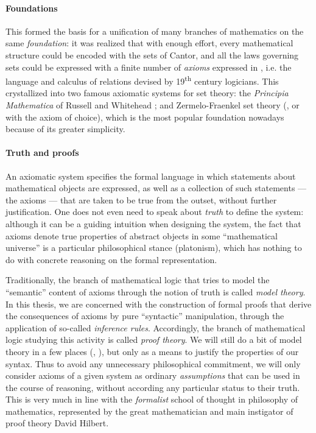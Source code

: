 \paragraph{Foundations}

This formed the basis for a unification of many branches of mathematics on the
same \emph{foundation}: it was realized that with enough effort, every
mathematical structure could be encoded with the sets of Cantor, and all the
laws governing sets could be expressed with a finite number of \emph{axioms}
expressed in , i.e. the language and calculus of relations
devised by 19\textsuperscript{th} century logicians. This crystallized into two
famous axiomatic systems for set theory: the \textit{Principia Mathematica} of
Russell and Whitehead ; and Zermelo-Fraenkel set theory
(, or  with the axiom of choice), which is the most popular
foundation nowadays because of its greater simplicity.

\paragraph{Truth and proofs}

An axiomatic system specifies the formal language in which statements about
mathematical objects are expressed, as well as a collection of such statements
--- the axioms --- that are taken to be true from the outset, without further
justification. One does not even need to speak about \emph{truth} to define the
system: although it can be a guiding intuition when designing the system, the
fact that axioms denote true properties of abstract objects in some
``mathematical universe'' is a particular philosophical stance (platonism),
which has nothing to do with concrete reasoning on the formal representation.

Traditionally, the branch of mathematical logic that tries to model the
``semantic'' content of axioms through the notion of truth is called \emph{model
theory}. In this thesis, we are concerned with the construction of formal proofs
that derive the consequences of axioms by pure ``syntactic'' manipulation,
through the application of so-called \emph{inference rules}. Accordingly, the
branch of mathematical logic studying this activity is called \emph{proof
theory}. We will still do a bit of model theory in a few places
(, ), but only as a means to
justify the properties of our syntax. Thus to avoid any unnecessary
philosophical commitment, we will only consider axioms of a given system as
ordinary \emph{assumptions} that can be used in the course of reasoning, without
according any particular status to their truth. This is very much in line with
the \emph{formalist} school of thought in philosophy of mathematics, represented
by the great mathematician and main instigator of proof theory David Hilbert.

